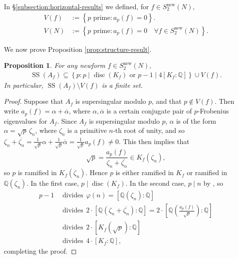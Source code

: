 \documentclass[11pt,letterpaper,reqno]{amsart}
\newtheorem{proposition}[theorem]{Proposition}
\theoremstyle{definition}
\numberwithin{equation}{section}
\numberwithin{figure}{section}
\numberwithin{table}{section}
\newcommand{\nw}{\mathrm{new}}
\begin{document}
In \S\ref{subsection:horizontal-results} we defined, for $f \in S_2^{\nw}(N),$
\begin{align}
    V(f) &:= \left\{ \text{$p$ prime} : a_p(f) = 0  \right\}.\\
        V(N) &:= \left\{ \text{$p$ prime} : a_p(f) = 0 \quad \forall f \in S_2^\nw(N) \right\}.
\end{align}

We now prove Proposition \ref{prop:structure-result}.
{
\renewcommand{\thetheorem}{\ref{prop:structure-result}}
\begin{proposition}
    For any newform $f \in S_2^{\nw}(N),$ 
    \begin{align}
        \operatorname{SS}(A_f) \subseteq \left\{ p : p \mid \operatorname{disc}(K_f) \text{ or } p - 1 \mid 4[K_f : \mathbb{Q} ] \right\} \cup V(f). \label{eqn:RHS-structure-result}
    \end{align}
    In particular, $\operatorname{SS}(A_f) \setminus V(f)$ is a finite set.
\end{proposition}
\addtocounter{theorem}{-1}
}

\begin{proof}
Suppose that $A_f$ is supersingular modulo $p$, and that $p \notin V(f)$. Then write 
$a_p(f) = \alpha + \overline\alpha$, where $\alpha,\overline \alpha$ is a certain conjugate pair of $p$-Frobenius eigenvalues for $A_f$. Since $A_f$ is supersingular modulo $p$, $\alpha$ is of the form $\alpha = \sqrt p \, \zeta_n$, where 
$\zeta_n$ is a primitive $n$-th root of unity, and so $\zeta_n + \overline{\zeta_n} = \frac{1}{\sqrt p} \alpha + \frac{1}{\sqrt p} \overline{\alpha} = \frac{1}{\sqrt{p}} a_p(f) \ne 0$. This then implies that
$$\sqrt{p} = \frac{a_p(f)}{\zeta_n + \overline{\zeta_n}} \in K_f(\zeta_n),$$
so $p$ is ramified in  $K_f(\zeta_n)$. Hence $p$ is either ramified in $K_f$ or ramified in $\mathbb{Q}(\zeta_n).$ In the first case, $p \mid \operatorname{disc}(K_f).$ In the second case, $p \mid n$ by \cite[Proposition 2.3]{washington1997introduction}, so 
\begin{align}
    p - 1 &\ \ \text{divides} \ \ \varphi(n) = \left[ \mathbb{Q}(\zeta_n) : \mathbb{Q}  \right]\\
    &\ \  \text{divides} \ \   2 \cdot \left[ \mathbb{Q} \left( \zeta_n + \overline{\zeta_n}\right) : \mathbb{Q} \right] = 2 \cdot  \left[ \mathbb{Q} \left( \frac{a_p(f)}{\sqrt{p}} \right) : \mathbb{Q} \right] \\
    &\ \  \text{divides} \ \  2 \cdot  [K_f (\sqrt{p}) : \mathbb{Q}] \\
    &\ \  \text{divides} \ \  4 \cdot [K_f : \mathbb{Q}],
\end{align}
completing the proof.
\end{proof}
\end{document}
